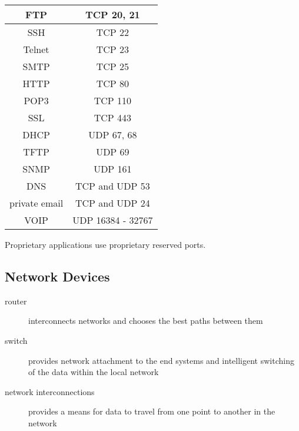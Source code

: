 \begin{tabular}{ | c | c | }
\hline
FTP & TCP 20, 21 \\ \hline
SSH & TCP 22 \\ \hline
Telnet & TCP 23 \\ \hline
SMTP & TCP 25 \\ \hline
HTTP & TCP 80 \\ \hline
POP3 & TCP 110 \\ \hline
SSL & TCP 443 \\ \hline
\hline
DHCP & UDP 67, 68 \\ \hline
TFTP & UDP 69 \\ \hline
SNMP & UDP 161 \\ \hline
\hline
DNS & TCP and UDP 53 \\ \hline
private email & TCP and UDP 24 \\ \hline
\hline
VOIP & UDP 16384 - 32767 \\ \hline
\end{tabular}

Proprietary applications use proprietary reserved ports.

\subsection{Network Devices}

\begin{description}

\item[router]
interconnects networks and chooses the best paths between them

\item[switch]
provides network attachment to the end systems and intelligent switching of
the data within the local network

\item[network interconnections]
 provides a means for data to travel from one point to another in the network

\end{description}
